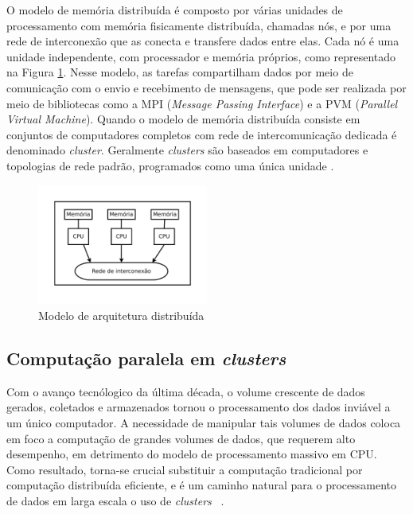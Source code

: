 O modelo de memória distribuída é composto por várias unidades de processamento  com memória fisicamente distribuída, chamadas nós, e por uma rede de interconexão que as conecta e transfere dados entre elas. 
Cada nó é uma unidade independente, com processador e memória próprios, como representado na Figura \ref{fig:ArquiteturaDistribuida}.
Nesse modelo, as tarefas compartilham dados por meio de comunicação com o envio e recebimento de mensagens, que pode ser realizada por meio de bibliotecas como a MPI (\textit{Message Passing Interface}) e a PVM (\textit{Parallel Virtual Machine}).
Quando o modelo de memória distribuída consiste em conjuntos de computadores completos com rede de intercomunicação dedicada é denominado \textit{cluster}. Geralmente \textit{clusters} são baseados em computadores e topologias de rede padrão, programados como uma única unidade \cite{Rauber:2010}.


\begin{figure}[htb]
\centering
\includegraphics[trim=0cm 1cm 0cm 0cm, width=0.5\textwidth]{figuras/Arquitetura.pdf}
\caption{Modelo de arquitetura distribuída}
\label{fig:ArquiteturaDistribuida}
\end{figure}

\subsection{Computação paralela em \textit{clusters}}
Com o avanço tecnólogico da última década, o volume crescente de dados gerados, coletados e armazenados tornou o processamento dos dados inviável a um único computador.
A necessidade de manipular tais volumes de dados coloca em foco a computação de grandes volumes de dados, que requerem alto desempenho, em detrimento do modelo de processamento massivo em CPU.  Como resultado, torna-se crucial substituir a computação tradicional por computação distribuída eficiente, e é um caminho natural para o processamento de dados em larga escala o uso de \textit{clusters} ~\cite{Lin:2010}.

